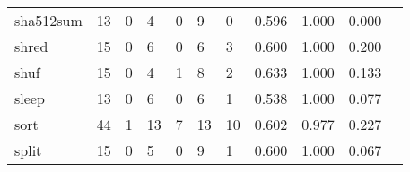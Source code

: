 \begin{longtable}{lp{1.20cm}p{1.20cm}p{1.20cm}p{1.20cm}p{1.20cm}p{1.20cm}p{1.20cm}p{1.20cm}p{1.20cm}p{1.20cm}}
sha512sum &                                    13 &                                                  0 &                                                  4 &                                                  0 &                                                  9 &                                                  0 &                                         0.596 &                                              1.000 &                                              0.000 \\
shred     &                                    15 &                                                  0 &                                                  6 &                                                  0 &                                                  6 &                                                  3 &                                         0.600 &                                              1.000 &                                              0.200 \\
shuf      &                                    15 &                                                  0 &                                                  4 &                                                  1 &                                                  8 &                                                  2 &                                         0.633 &                                              1.000 &                                              0.133 \\
sleep     &                                    13 &                                                  0 &                                                  6 &                                                  0 &                                                  6 &                                                  1 &                                         0.538 &                                              1.000 &                                              0.077 \\
sort      &                                    44 &                                                  1 &                                                 13 &                                                  7 &                                                 13 &                                                 10 &                                         0.602 &                                              0.977 &                                              0.227 \\
split     &                                    15 &                                                  0 &                                                  5 &                                                  0 &                                                  9 &                                                  1 &                                         0.600 &                                              1.000 &                                              0.067 \\

\end{longtable}
